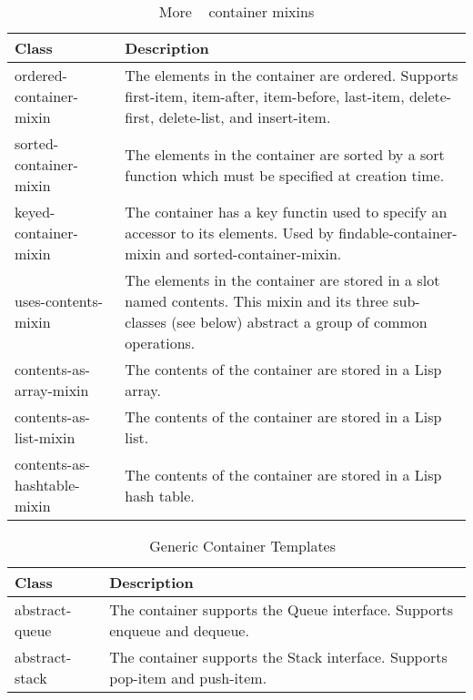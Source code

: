 \documentclass{acm_proc_article-sp}
\begin{document}
\begin{table*}[htb]
\begin{center}
\begin{tabular}{|lp{3 in}|} \hline
Class & \vline \quad Description \\ \hline
\hline

ordered-container-mixin & The elements in the container are ordered.
Supports first-item, item-after, item-before, last-item, delete-first,
delete-list, and insert-item. \\

sorted-container-mixin & The elements in the container are sorted by a
sort function which must be specified at creation time. \\

keyed-container-mixin & The container has a key functin used to specify
an accessor to its elements. Used by findable-container-mixin and
sorted-container-mixin. \\

uses-contents-mixin & The elements in the container are stored in a slot
named contents. This mixin and its three sub-classes (see below)
abstract a group of common operations. \\ 

contents-as-array-mixin & The contents of the container are stored in a
Lisp array. \\

contents-as-list-mixin & The contents of the container are stored in a
Lisp list. \\

contents-as-hashtable-mixin & The contents of the container are stored in
a Lisp hash table. \\

\hline
\end{tabular}
\end{center}
\caption{More \clcl~ container mixins}
\label{tbl:more-container-mixins}
\end{table*}



\begin{table*}[htb]
\begin{center}
\begin{tabular}{|lp{3 in}|} \hline
Class & \vline \quad Description \\ \hline

abstract-queue & The container supports the Queue interface. Supports
enqueue and dequeue. \\

abstract-stack & The container supports the Stack interface. Supports
pop-item and push-item. \\ \hline

\end{tabular}
\end{center}
\caption{\clcl~ Generic Container Templates}
\label{tbl:container-abstractions}
\end{table*}
\end{document}
